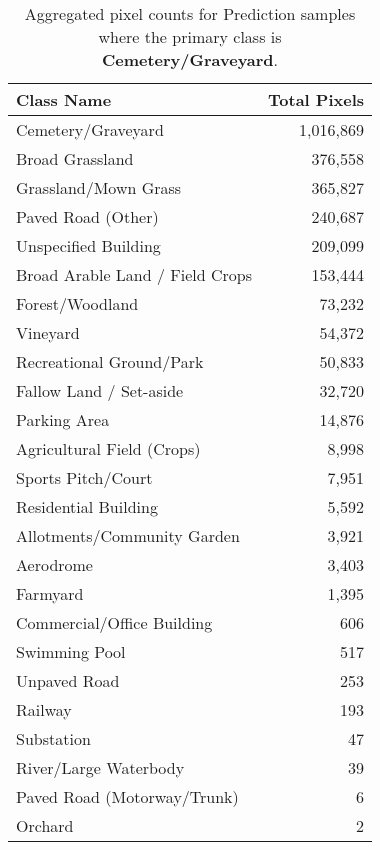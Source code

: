\begin{table}[H] %
    \centering
    \caption{Aggregated pixel counts for Prediction samples where the primary class is \textbf{Cemetery/Graveyard}.}
    \label{tab:pred_counts_32}
    \begin{tabular}{lr}
        \hline
        \textbf{Class Name} & \textbf{Total Pixels} \\
        \hline
        Cemetery/Graveyard & 1,016,869 \\
        Broad Grassland & 376,558 \\
        Grassland/Mown Grass & 365,827 \\
        Paved Road (Other) & 240,687 \\
        Unspecified Building & 209,099 \\
        Broad Arable Land / Field Crops & 153,444 \\
        Forest/Woodland & 73,232 \\
        Vineyard & 54,372 \\
        Recreational Ground/Park & 50,833 \\
        Fallow Land / Set-aside & 32,720 \\
        Parking Area & 14,876 \\
        Agricultural Field (Crops) & 8,998 \\
        Sports Pitch/Court & 7,951 \\
        Residential Building & 5,592 \\
        Allotments/Community Garden & 3,921 \\
        Aerodrome & 3,403 \\
        Farmyard & 1,395 \\
        Commercial/Office Building & 606 \\
        Swimming Pool & 517 \\
        Unpaved Road & 253 \\
        Railway & 193 \\
        Substation & 47 \\
        River/Large Waterbody & 39 \\
        Paved Road (Motorway/Trunk) & 6 \\
        Orchard & 2 \\
        \hline
    \end{tabular}
\end{table}

